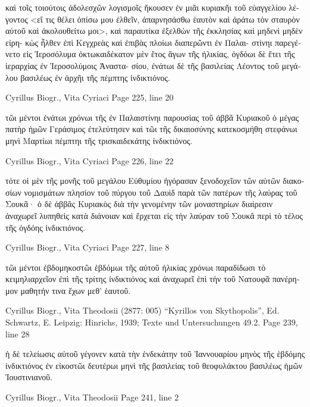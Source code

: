 \documentclass[12pt,letterpaper,twoside,final]{memoir}
\begin{document}
\begin{greek}
                                                καὶ τοῖς τοιούτοις 
ἀδολεσχῶν λογισμοῖς ἤκουσεν ἐν μιᾶι κυριακῆι τοῦ εὐαγγελίου λέ-
γοντος <εἴ τις θέλει ὀπίσω μου ἐλθεῖν, ἀπαρνησάσθω 
ἑαυτὸν καὶ ἀράτω τὸν σταυρὸν αὐτοῦ καὶ ἀκολουθείτω 
μοι>, καὶ παραυτίκα ἐξελθὼν τῆς ἐκκλησίας καὶ μηδενὶ μηδὲν εἰρη-
κὼς ἦλθεν ἐπὶ Κεγχρεὰς καὶ ἐπιβὰς πλοίωι διαπερῶντι ἐν Παλαι-
στίνηι παρεγένετο εἰς Ἱεροσόλυμα ὀκτωκαιδέκατον μὲν ἔτος ἄγων 
τῆς ἡλικίας, ὀγδόωι δὲ ἔτει τῆς ἱεραρχίας ἐν Ἱεροσολύμοις Ἀναστα-
σίου, ἐνάτωι δὲ τῆς βασιλείας Λέοντος τοῦ μεγάλου βασιλέως ἐν 
ἀρχῆι τῆς πέμπτης ἰνδικτιόνος. 



Cyrillus Biogr., Vita Cyriaci 
Page 225, line 20

                                               τῶι μέντοι ἐνάτωι χρόνωι 
τῆς ἐν Παλαιστίνηι παρουσίας τοῦ ἀββᾶ Κυριακοῦ ὁ μέγας πατὴρ 
ἡμῶν Γεράσιμος ἐτελεύτησεν καὶ τῶι τῆς δικαιοσύνης κατεκοσμήθη 
στεφάνωι μηνὶ Μαρτίωι πέμπτηι τῆς τρισκαιδεκάτης ἰνδικτιόνος. 



Cyrillus Biogr., Vita Cyriaci 
Page 226, line 22

                          τότε οἱ μὲν τῆς μονῆς τοῦ μεγάλου Εὐθυμίου 
ἠγόρασαν ξενοδοχεῖον τῶν αὐτῶν διακοσίων νομισμάτων πλησίον 
τοῦ πύργου τοῦ Δαυὶδ παρὰ τῶν πατέρων τῆς λαύρας τοῦ Σουκᾶ· 
ὁ δὲ ἀββᾶς Κυριακὸς διὰ τὴν γενομένην τῶν μοναστηρίων διαίρεσιν 
ἀναχωρεῖ λυπηθεὶς κατὰ διάνοιαν καὶ ἔρχεται εἰς τὴν λαύραν τοῦ 
Σουκᾶ περὶ τὸ τέλος τῆς ὀγδόης ἰνδικτιόνος. 



Cyrillus Biogr., Vita Cyriaci 
Page 227, line 8

                                                  τῶι μέντοι ἑβδομηκοστῶι 
ἑβδόμωι τῆς αὐτοῦ ἡλικίας χρόνωι παραδίδωσι τὸ κειμηλιαρχεῖον 
ἐπὶ τῆς τρίτης ἰνδικτιόνος καὶ ἀναχωρεῖ ἐπὶ τὴν τοῦ Νατουφᾶ πανέρημον 
μαθητήν τινα ἔχων μεθ' ἑαυτοῦ. 



Cyrillus Biogr., Vita Theodosii (2877: 005)
“Kyrillos von Skythopolis”, Ed. Schwartz, E.
Leipzig: Hinrichs, 1939; Texte und Untersuchungen 49.2.
Page 239, line 28

                                      ἡ δὲ τελείωσις αὐτοῦ γέγονεν κατὰ 
τὴν ἑνδεκάτην τοῦ Ἰαννουαρίου μηνὸς τῆς ἑβδόμης ἰνδικτιόνος ἐν 
εἰκοστῶι δευτέρωι μηνὶ τῆς βασιλείας τοῦ θεοφυλάκτου βασιλέως 
ἡμῶν Ἰουστινιανοῦ. 



Cyrillus Biogr., Vita Theodosii 
Page 241, line 2


\end{greek}
\end{document}
